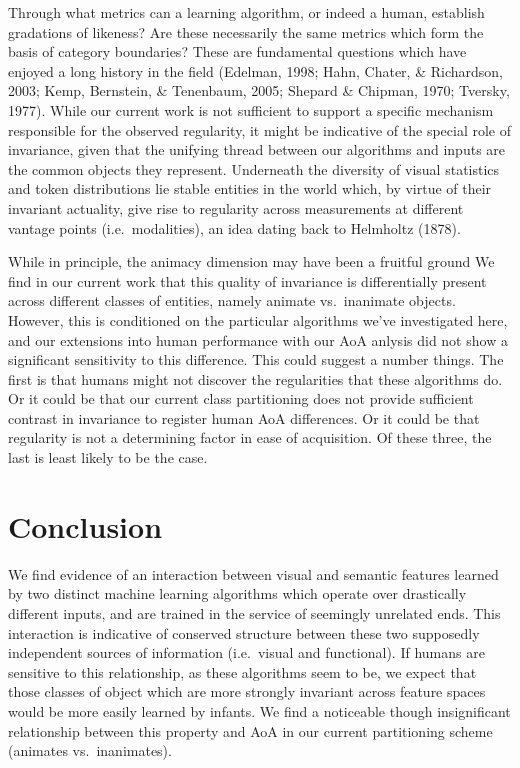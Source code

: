 \documentclass[10pt, letterpaper]{article}
\begin{document}
Through what metrics can a learning algorithm, or indeed a human,
establish gradations of likeness? Are these necessarily the same metrics
which form the basis of category boundaries? These are fundamental
questions which have enjoyed a long history in the field (Edelman, 1998;
Hahn, Chater, \& Richardson, 2003; Kemp, Bernstein, \& Tenenbaum, 2005;
Shepard \& Chipman, 1970; Tversky, 1977). While our current work is not
sufficient to support a specific mechanism responsible for the observed
regularity, it might be indicative of the special role of invariance,
given that the unifying thread between our algorithms and inputs are the
common objects they represent. Underneath the diversity of visual
statistics and token distributions lie stable entities in the world
which, by virtue of their invariant actuality, give rise to regularity
across measurements at different vantage points (i.e.~modalities), an
idea dating back to Helmholtz (1878).

While in principle, the animacy dimension may have been a fruitful
ground We find in our current work that this quality of invariance is
differentially present across different classes of entities, namely
animate vs.~inanimate objects. However, this is conditioned on the
particular algorithms we've investigated here, and our extensions into
human performance with our AoA anlysis did not show a significant
sensitivity to this difference. This could suggest a number things. The
first is that humans might not discover the regularities that these
algorithms do. Or it could be that our current class partitioning does
not provide sufficient contrast in invariance to register human AoA
differences. Or it could be that regularity is not a determining factor
in ease of acquisition. Of these three, the last is least likely to be
the case.

\section{Conclusion}\label{conclusion}

We find evidence of an interaction between visual and semantic features
learned by two distinct machine learning algorithms which operate over
drastically different inputs, and are trained in the service of
seemingly unrelated ends. This interaction is indicative of conserved
structure between these two supposedly independent sources of
information (i.e.~visual and functional). If humans are sensitive to
this relationship, as these algorithms seem to be, we expect that those
classes of object which are more strongly invariant across feature
spaces would be more easily learned by infants. We find a noticeable
though insignificant relationship between this property and AoA in our
current partitioning scheme (animates vs.~inanimates).
\end{document}
